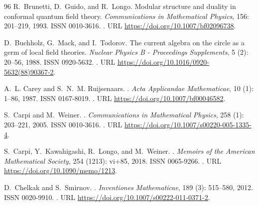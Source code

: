 \documentclass[a4paper, 11pt]{article}
\DeclareMathOperator{\1}{\mathds{1}}
\begin{document}
\begin{thebibliography}{96}
R.~Brunetti, D.~Guido, and R.~Longo.
\newblock Modular structure and duality in conformal quantum field theory.
\newblock \emph{Communications in Mathematical Physics}, 156:
  201--219, 1993.
\newblock ISSN 0010-3616.
\newblock {}.
\newblock URL \url{https://doi.org/10.1007/bf02096738}.

D.~Buchholz, G.~Mack, and I.~Todorov.
\newblock The current algebra on the circle as a germ of local field theories.
\newblock \emph{Nuclear Physics B - Proceedings Supplements}, 5
  (2): 20--56, 1988.
\newblock ISSN 0920-5632.
\newblock {}.
\newblock URL \url{https://doi.org/10.1016/0920-5632(88)90367-2}.

A.~L. Carey and S.~N.~M. Ruijsenaars.
.
\newblock \emph{Acta Applicandae Mathematicae}, 10 (1):
  1--86, 1987.
\newblock ISSN 0167-8019.
\newblock {}.
\newblock URL \url{https://doi.org/10.1007/bf00046582}.

S.~Carpi and M.~Weiner.
.
\newblock \emph{Communications in Mathematical Physics}, 258
  (1): 203--221, 2005.
\newblock ISSN 0010-3616.
\newblock {}.
\newblock URL \url{https://doi.org/10.1007/s00220-005-1335-4}.

S.~Carpi, Y.~Kawahigashi, R.~Longo, and M.~Weiner.
.
\newblock \emph{Memoirs of the American Mathematical Society}, 254
  (1213): vi+85, 2018.
\newblock ISSN 0065-9266.
\newblock {}.
\newblock URL \url{https://doi.org/10.1090/memo/1213}.

D.~Chelkak and S.~Smirnov.
.
\newblock \emph{Inventiones Mathematicae}, 189 (3): 515--580,
  2012.
\newblock ISSN 0020-9910.
\newblock {}.
\newblock URL \url{https://doi.org/10.1007/s00222-011-0371-2}.


\end{thebibliography}
\end{document}
